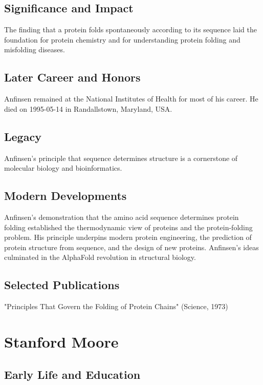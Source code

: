 \subsection*{Significance and Impact}

The finding that a protein folds spontaneously according to its sequence laid the foundation for protein chemistry and for understanding protein folding and misfolding diseases.

\subsection*{Later Career and Honors}

Anfinsen remained at the National Institutes of Health for most of his career. He died on 1995-05-14 in Randallstown, Maryland, USA.

\subsection*{Legacy}

Anfinsen's principle that sequence determines structure is a cornerstone of molecular biology and bioinformatics.

\subsection*{Modern Developments}

Anfinsen's demonstration that the amino acid sequence determines protein folding established the thermodynamic view of proteins and the protein-folding problem. His principle underpins modern protein engineering, the prediction of protein structure from sequence, and the design of new proteins. Anfinsen's ideas culminated in the AlphaFold revolution in structural biology.

\subsection*{Selected Publications}

"Principles That Govern the Folding of Protein Chains" (Science, 1973)

\clearpage

\section{Stanford Moore}

\subsection*{Early Life and Education}


